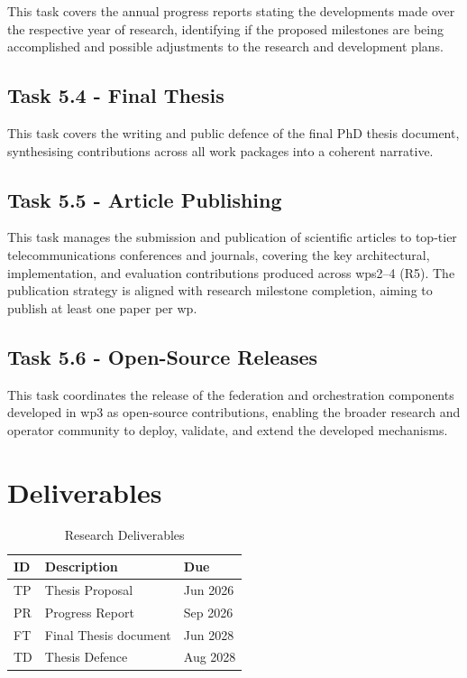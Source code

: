 This task covers the annual progress reports stating the developments made over the respective year of research, identifying if the proposed milestones are being accomplished and possible adjustments to the research and development plans. 

\subsection{Task 5.4 - Final Thesis}

This task covers the writing and public defence of the final PhD thesis document, synthesising contributions across all work packages into a coherent narrative.

\subsection{Task 5.5 - Article Publishing}

This task manages the submission and publication of scientific articles to top-tier telecommunications conferences and journals, covering the key architectural, implementation, and evaluation contributions produced across \acp{wp}2--4 (R5). The publication strategy is aligned with research milestone completion, aiming to publish at least one paper per \ac{wp}.

\subsection{Task 5.6 - Open-Source Releases}

This task coordinates the release of the federation and orchestration components developed in \ac{wp}3 as open-source contributions, enabling the broader research and operator community to deploy, validate, and extend the developed mechanisms.


\section{Deliverables}

\begin{table}[h!]
\centering
\caption{Research Deliverables}
\label{tab:deliverables}
\renewcommand{\arraystretch}{1.3}
\begin{tabular}{@{}lp{8.5cm}l@{}}
\hline
\textbf{ID} & \textbf{Description} & \textbf{Due} \\
\hline
TP & Thesis Proposal                & Jun 2026 \\
PR & Progress Report                & Sep 2026 \\
FT & Final Thesis document          & Jun 2028 \\
TD & Thesis Defence                 & Aug 2028 \\
\hline
\end{tabular}
\end{table}


